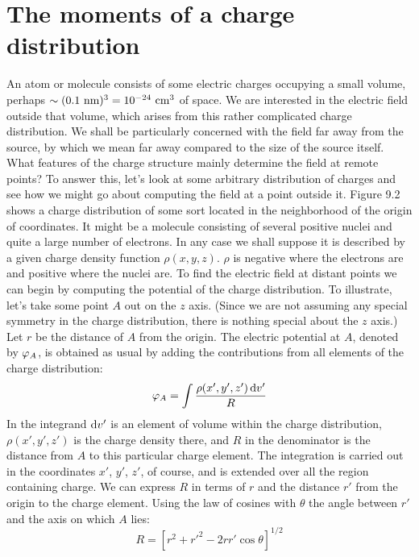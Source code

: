\section{The moments of a charge distribution}

An atom or molecule consists of some electric charges occupying
a small volume, perhaps \linebreak[4]$\sim (0.1\ \zu{nm})^3=10^{-24}\ \cmunit^3$ of space.
We are interested in the electric field outside that volume, which
arises from this rather complicated charge distribution. We shall
be particularly concerned with the field far away from the source,
by which we mean far away compared to the size of the source itself.
What features of the charge structure mainly determine the field at
remote points? To answer this, let's look at some arbitrary distribution
of charges and see how we might go about computing the field
at a point outside it. Figure 9.2 shows a charge distribution of some
sort located in the neighborhood of the origin of coordinates. It
might be a molecule consisting of several positive nuclei and quite
a large number of electrons. In any case we shall suppose it is described
by a given charge density function $\rho(x,y,z)$. $\rho$ is negative
where the electrons are and positive where the nuclei are. To find
the electric field at distant points we can begin by computing the
potential of the charge distribution. To illustrate, let's take some
point $A$ out on the $z$ axis. (Since we are not assuming any special
symmetry in the charge distribution, there is nothing special about
the $z$ axis.) Let $r$ be the distance of $A$ from the origin. The electric
potential at $A$, denoted by $\varphi_A$, is obtained as usual by adding the
contributions from all elements of the charge distribution:
\begin{equation}
  \varphi_A = \int \frac{\rho(x',y',z')\operatorname{d\!} v'}{R}
\end{equation}
In the integrand $\operatorname{d\!} v'$ is an element of volume within the charge 
distribution, $\rho(x',y',z')$ is the charge density there, and $R$ in the denominator
is the distance from $A$ to this particular charge element. The
integration is carried out in the coordinates $x'$, $y'$, $z'$, of course, and
is extended over all the region containing charge. We can express $R$
in terms of $r$ and the distance $r'$ from the origin to the charge element.
Using the law of cosines with $\theta$ the angle between $r'$ and the axis on
which $A$ lies:
\begin{equation}
  R = [r^2 + r'^2 - 2rr'\cos\theta]^{1/2}
\end{equation}
